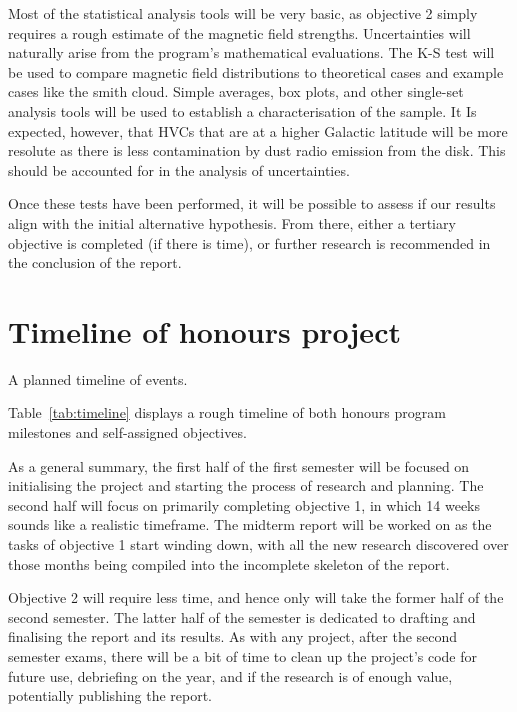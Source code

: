 Most of the statistical analysis tools will be very basic, as objective 2 simply requires a rough estimate of the magnetic field strengths. Uncertainties will naturally arise from the program's mathematical evaluations. The K-S test will be used to compare magnetic field distributions to theoretical cases and example cases like the smith cloud. Simple averages, box plots, and other single-set analysis tools will be used to establish a characterisation of the sample. It Is expected, however, that HVCs that are at a higher Galactic latitude will be more resolute as there is less contamination by dust radio emission from the disk. This should be accounted for in the analysis of uncertainties.

Once these tests have been performed, it will be possible to assess if our results align with the initial alternative hypothesis. From there, either a tertiary objective is completed (if there is time), or further research is recommended in the conclusion of the report.

\section{Timeline of honours project}
\label{sec:timeline}

\begin{table}[ht]
  \centering
  
  \caption{A planned timeline of events.}
  \label{tab:timeline}
\end{table}

Table~\ref{tab:timeline} displays a rough timeline of both honours program milestones and self-assigned objectives.

As a general summary, the first half of the first semester will be focused on initialising the project and starting the process of research and planning. The second half will focus on primarily completing objective 1, in which 14 weeks sounds like a realistic timeframe. The midterm report will be worked on as the tasks of objective 1 start winding down, with all the new research discovered over those months being compiled into the incomplete skeleton of the report.

Objective 2 will require less time, and hence only will take the former half of the second semester. The latter half of the semester is dedicated to drafting and finalising the report and its results. As with any project, after the second semester exams, there will be a bit of time to clean up the project's code for future use, debriefing on the year, and if the research is of enough value, potentially publishing the report.

